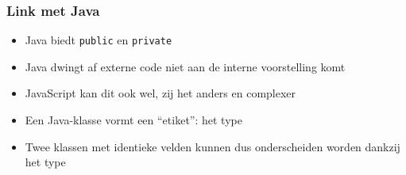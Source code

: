 \begin{frame}
\begin{center}
  \end{center}
\end{frame}

\begin{frame}
  \frametitle{Link met Java}
  \begin{itemize}
    \item Java biedt {\tt public} en {\tt private}
    \item Java dwingt af externe code niet aan de interne voorstelling komt
    \item JavaScript kan dit ook wel, zij het anders en complexer      
  \end{itemize}

  \vskip5mm

  \begin{itemize}
    \item Een Java-klasse vormt een ``etiket'': het type
    \item Twee klassen met identieke velden kunnen dus onderscheiden worden dankzij het type
  \end{itemize}
\end{frame}



